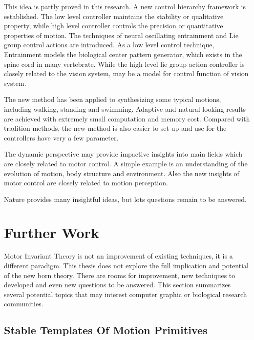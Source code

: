 This idea is partly proved in this research.
A new control hierarchy framework is established.
The low level controller maintains the stability or qualitative property,
while high level controller controls the precision or quantitative properties of motion.
The techniques of neural oscillating entrainment and Lie group control actions are introduced.
As a low level control technique, Entrainment  models the biological center pattern generator, which exists in the spine cord in many vertebrate.
While the high level lie group action controller is closely related to the vision system, may be a model for control function of vision system.


The new method has been applied to synthesizing some typical motions, including walking, standing and swimming.
Adaptive and natural looking results are achieved with extremely small computation and memory cost.
Compared with tradition methods, the new method is also easier to set-up and use for the controllers have very a few parameter.


The dynamic perspective may provide impactive insights into main fields which are closely related to motor control.
A simple example is an understanding of the evolution  of motion, body structure and environment.
Also the new insights of motor control are closely related to motion perception.

Nature provides many insightful ideas, but lots questions remain to be answered.













 




\section{Further Work}
Motor Invariant Theory is not an improvement of existing \cms techniques, it is a different paradigm.
This thesis does not explore the full implication and potential of the new born theory.
There are rooms for improvement, new techniques to developed and even new questions to be answered.
This section summarizes several potential topics that may interest computer graphic  or biological research communities.

\subsection{Stable Templates Of Motion Primitives}

